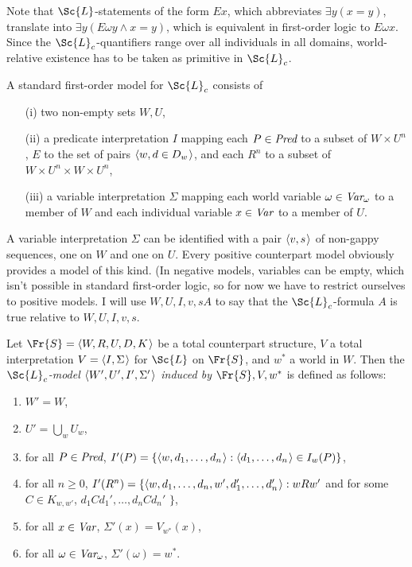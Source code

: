 \documentclass[11pt]{woarticle}
\theoremstyle{break}
\theoremstyle{nonumberplain}
\newcommand{\1}{\;\,|\;\,}
\renewcommand{\t}[1]{\ensuremath{\langle #1  \makebox[.2ex]{}\rangle}}
\begin{document}
{{} %

Note that $\Sc{L}$-statements of the form $Ex$, which abbreviates
$\exists y(x\!=\!y)$, translate into $\exists y(E\omega y \land
x\!=\!y)$, which is equivalent in first-order logic to $E\omega
x$. Since the $\Sc{L}_c$-quantifiers range over all individuals in all
domains, world-relative existence has to be taken as primitive in
$\Sc{L}_c$.

A standard first-order model for $\Sc{L}_c$ consists of
\begin{enumerate}
\item[(i)] two non-empty sets $W,U$,
\item[(ii)] a predicate interpretation $I$ mapping each $P \in
  \emph{Pred}$ to a subset of $W \times U^n$, $E$ to the set of pairs
  $\t{w,d\in D_w}$, and each $R^n$ to a subset of $W \times U^n \times
  W \times U^n$,
\item[(iii)] a variable interpretation $\Sigma$ mapping each world
  variable $\omega \in \emph{Var}_\omega$ to a member of $W$ and each
  individual variable $x \in \emph{Var}$ to a member of $U$.
\end{enumerate}
A variable interpretation $\Sigma$ can be identified with a pair
$\t{v,s}$ of non-gappy sequences, one on $W$ and one on $U$. Every
positive counterpart model obviously provides a model of this
kind. (In negative models, variables can be empty, which isn't
possible in standard first-order logic, so for now we have to restrict
ourselves to positive models. I will use $W,U,I,v,s A$ to say that the
$\Sc{L}_c$-formula $A$ is true relative to $W,U,I,v,s$.

\begin{definition}{\label{!MODCORR}}
  Let $\Fr{S} = \t{W,R,U,D,K}$ be a total counterpart structure, $V$ a
  total interpretation $V = \t{I,\Sigma}$ for $\Sc{L}$ on $\Fr{S}$,
  and $w^*$ a world in $W$. Then the \emph{$\Sc{L}_c$-model
    $\t{W',U',I',\Sigma'}$ induced by $\Fr{S},V,w^*$} is defined as
  follows:
  \begin{enumerate}
  \item $W' = W$,
  \item $U' = \bigcup_w U_w$,
  \item for all $P \in \emph{Pred}$, $I'(P) = \{
    \t{w,d_1,\ldots,d_n} : \t{d_1,\ldots,d_n} \in I_w(P) \}$,
  \item for all $n \geq 0$, $I'(R^n) = \{
    \t{w,d_1,\ldots,d_n,w',d_1',\ldots,d_n'} : wRw'$ and for some $C \in
    K_{w,w'}$, $d_1Cd_1', \ldots, d_nCd_n'$ $\}$,
  \item for all $x \in \emph{Var}$, $\Sigma'(x) = V_{w^*}(x)$,
  \item for all $\omega \in \emph{Var}_\omega$, $\Sigma'(\omega) = w^*$.
  \end{enumerate}
\end{definition}

}
\end{document}
